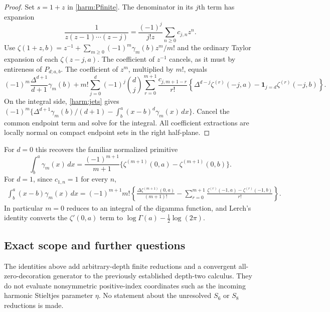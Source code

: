 \begin{proof}
Set $s=1+z$ in \eqref{harm:Pfinite}. The denominator in its $j$th
term has expansion
\[
 \frac1{z(z-1)\cdots(z-j)}
       =\frac{(-1)^j}{j!z}\sum_{n\ge0}c_{j,n}z^n.
\]
Use
$\zeta(1+z,b)=z^{-1}+\sum_{m\ge0}(-1)^m\gamma_m(b)z^m/m!$
and the ordinary Taylor expansion of each $\zeta(z-j,a)$.
The coefficient of $z^{-1}$ cancels, as it must by entireness of
$P_{d;a,b}$. The coefficient of $z^m$, multiplied by $m!$, equals
\[
 (-1)^m\frac{\Delta^{d+1}}{d+1}\gamma_m(b)
 +m!\sum_{j=0}^d(-1)^j\binom dj
    \sum_{r=0}^{m+1}\frac{c_{j,m+1-r}}{r!}
       \left\{\Delta^{d-j}\zeta^{(r)}(-j,a)
                         -\mathbf1_{j=d}\zeta^{(r)}(-j,b)\right\}.
\]
On the integral side, \eqref{harm:jets} gives
$(-1)^m\{\Delta^{d+1}\gamma_m(b)/(d+1)
 -\int_b^a(x-b)^d\gamma_m(x)\,dx\}$.
Cancel the common endpoint term and solve for the integral.
All coefficient extractions are locally normal on compact endpoint
sets in the right half-plane.
\end{proof}

For $d=0$ this recovers the familiar normalized primitive
\begin{equation}
 \int_b^a\gamma_m(x)\,dx
       =\frac{(-1)^{m+1}}{m+1}
          \{\zeta^{(m+1)}(0,a)-\zeta^{(m+1)}(0,b)\}.
 \label{harm:d0}
\end{equation}
For $d=1$, since $c_{1,n}=1$ for every $n$,
\begin{align}
 \int_b^a(x-b)\gamma_m(x)\,dx
  =(-1)^{m+1}m!\left\{
       \frac{\Delta\zeta^{(m+1)}(0,a)}{(m+1)!}
       -\sum_{r=0}^{m+1}
          \frac{\zeta^{(r)}(-1,a)-\zeta^{(r)}(-1,b)}{r!}
                         \right\}.
 \label{harm:d1}
\end{align}
In particular $m=0$ reduces to an integral of the digamma function,
and Lerch's identity converts the $\zeta'(0,a)$ term to
$\log\Gamma(a)-\tfrac12\log(2\pi)$.

\subsection{Exact scope and further questions}

The identities above add arbitrary-depth finite reductions and a
convergent all-zero-decoration generator to the previously established
depth-two calculus. They do not evaluate nonsymmetric positive-index
coordinates such as the incoming harmonic Stieltjes parameter $\eta$.
No statement about the unresolved $S_6$ or $S_8$ reductions is made.

